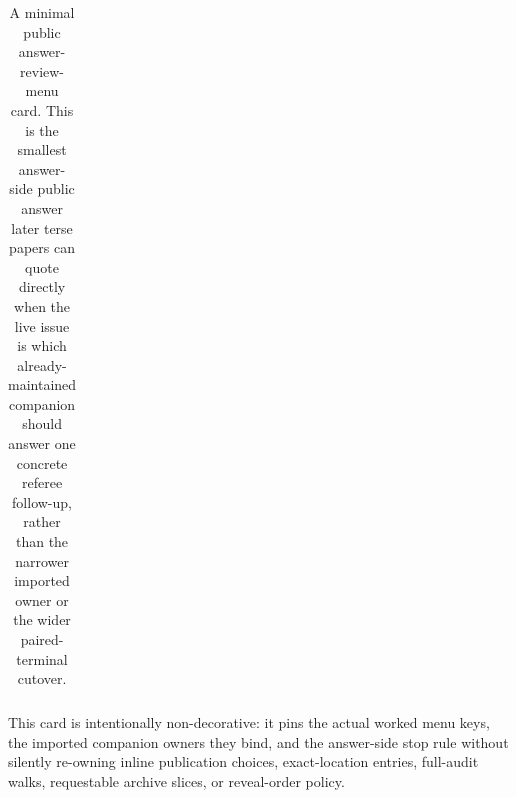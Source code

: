 \documentclass[11pt]{article}
\begin{document}
\begin{table}[t]
\begin{tabularx}{\linewidth}{@{}lX@{}}
\bottomrule
\end{tabularx}
\caption{A minimal public answer-review-menu card. This is the smallest answer-side public answer later terse papers can quote directly when the live issue is which already-maintained companion should answer one concrete referee follow-up, rather than the narrower imported owner or the wider paired-terminal cutover.}
\label{tab:minimal-public-answer-review-menu-card}
\end{table}

This card is intentionally non-decorative: it pins the actual worked menu keys, the imported companion owners they bind, and the answer-side stop rule without silently re-owning inline publication choices, exact-location entries, full-audit walks, requestable archive slices, or reveal-order policy.\cite{series:workedexample}
\end{document}

